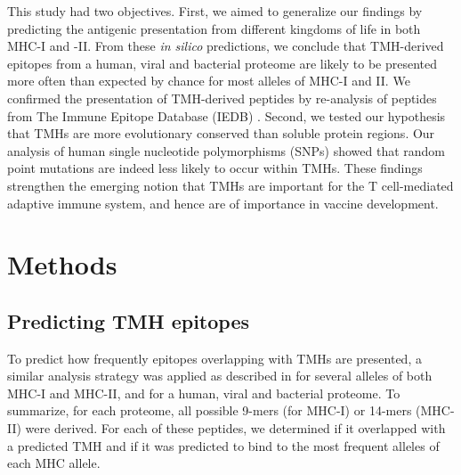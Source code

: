 This study had two objectives. 
First, we aimed to generalize our findings by predicting
the antigenic presentation
from different kingdoms of life in both MHC-I and -II. 
From these \emph{in silico} predictions, we conclude that TMH-derived
epitopes from a human, viral and bacterial proteome
are likely to be presented more often than expected by chance 
for most alleles of MHC-I and II. 
We confirmed the presentation of TMH-derived peptides 
by re-analysis of peptides from The Immune Epitope Database (IEDB) \cite{vita2019immune}.
Second, we tested our hypothesis that TMHs 
are more evolutionary conserved than soluble protein regions.
Our analysis of human single nucleotide polymorphisms (SNPs) showed 
that random point mutations are indeed less likely
to occur within TMHs. 
These findings strengthen the emerging notion 
that TMHs are important for the T cell-mediated adaptive immune system, 
and hence are of importance in vaccine development.

\section{Methods}

\subsection{Predicting TMH epitopes}

To predict how frequently epitopes overlapping with TMHs are presented,
a similar analysis strategy was applied as described in \cite{bianchi2017} 
for several alleles of both MHC-I and MHC-II, 
and for a human, viral and bacterial proteome.
To summarize, for each proteome, 
all possible 9-mers (for MHC-I) or 14-mers (MHC-II) were derived. 
For each of these peptides, we determined if it overlapped with a predicted 
TMH and if it was predicted to bind to the most frequent alleles of each MHC allele.

